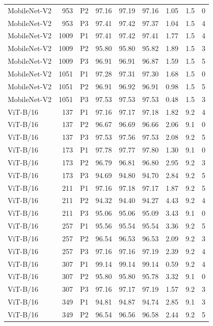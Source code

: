 {\begin{longtable}{lrlrrrrrr}
MobileNet-V2 & 953 & P2 & 97.16 & 97.19 & 97.16 & 1.05 & 1.5 & 0 \\
MobileNet-V2 & 953 & P3 & 97.41 & 97.42 & 97.37 & 1.04 & 1.5 & 4 \\
MobileNet-V2 & 1009 & P1 & 97.41 & 97.42 & 97.41 & 1.77 & 1.5 & 4 \\
MobileNet-V2 & 1009 & P2 & 95.80 & 95.80 & 95.82 & 1.89 & 1.5 & 3 \\
MobileNet-V2 & 1009 & P3 & 96.91 & 96.91 & 96.87 & 1.59 & 1.5 & 5 \\
MobileNet-V2 & 1051 & P1 & 97.28 & 97.31 & 97.30 & 1.68 & 1.5 & 0 \\
MobileNet-V2 & 1051 & P2 & 96.91 & 96.92 & 96.91 & 0.98 & 1.5 & 5 \\
MobileNet-V2 & 1051 & P3 & 97.53 & 97.53 & 97.53 & 0.48 & 1.5 & 3 \\
ViT-B/16 & 137 & P1 & 97.16 & 97.17 & 97.18 & 1.82 & 9.2 & 4 \\
ViT-B/16 & 137 & P2 & 96.67 & 96.69 & 96.66 & 2.06 & 9.1 & 0 \\
ViT-B/16 & 137 & P3 & 97.53 & 97.56 & 97.53 & 2.08 & 9.2 & 5 \\
ViT-B/16 & 173 & P1 & 97.78 & 97.77 & 97.80 & 1.30 & 9.1 & 0 \\
ViT-B/16 & 173 & P2 & 96.79 & 96.81 & 96.80 & 2.95 & 9.2 & 3 \\
ViT-B/16 & 173 & P3 & 94.69 & 94.80 & 94.70 & 2.84 & 9.2 & 5 \\
ViT-B/16 & 211 & P1 & 97.16 & 97.18 & 97.17 & 1.87 & 9.2 & 5 \\
ViT-B/16 & 211 & P2 & 94.32 & 94.40 & 94.27 & 4.43 & 9.2 & 4 \\
ViT-B/16 & 211 & P3 & 95.06 & 95.06 & 95.09 & 3.43 & 9.1 & 0 \\
ViT-B/16 & 257 & P1 & 95.56 & 95.54 & 95.54 & 3.36 & 9.2 & 5 \\
ViT-B/16 & 257 & P2 & 96.54 & 96.53 & 96.53 & 2.09 & 9.2 & 3 \\
ViT-B/16 & 257 & P3 & 97.16 & 97.16 & 97.19 & 2.39 & 9.2 & 4 \\
ViT-B/16 & 307 & P1 & 99.14 & 99.14 & 99.14 & 0.59 & 9.2 & 4 \\
ViT-B/16 & 307 & P2 & 95.80 & 95.80 & 95.78 & 3.32 & 9.1 & 0 \\
ViT-B/16 & 307 & P3 & 97.16 & 97.17 & 97.19 & 1.57 & 9.2 & 3 \\
ViT-B/16 & 349 & P1 & 94.81 & 94.87 & 94.74 & 2.85 & 9.1 & 3 \\
ViT-B/16 & 349 & P2 & 96.54 & 96.56 & 96.58 & 2.44 & 9.2 & 5 \\

\end{longtable}}
